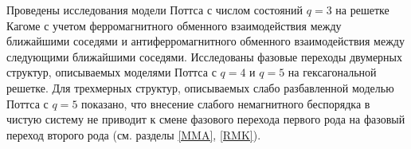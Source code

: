 Проведены исследования модели Поттса с числом состояний $q=3$ на решетке Кагоме с учетом ферромагнитного обменного взаимодействия между ближайшими
соседями и антиферромагнитного обменного взаимодействия между следующими ближайшими соседями. Исследованы фазовые переходы двумерных структур, описываемых моделями Поттса с $q=4$ и $q=5$ на гексагональной решетке. 
Для трехмерных структур, описываемых слабо разбавленной моделью Поттса с $q=5$ показано, что внесение слабого немагнитного беспорядка в
чистую систему не приводит к смене фазового перехода первого рода на фазовый переход второго рода (см. разделы \ref{MMA}, \ref{RMK}).






